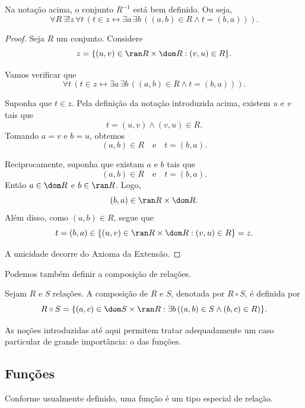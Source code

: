 \begin{lemma}[$\BST$]\label{lem:existenciaDaRelacaoInversa}
    Na notação acima, o conjunto $R^{-1}$ está bem definido.
    Ou seja,
    \[
        \forall R\, \exists! z\, \forall t\, (t \in z \leftrightarrow \exists a\, \exists b\, ((a, b) \in R \land t = (b, a))).
    \]
\end{lemma}
\begin{proof}
    Seja $R$ um conjunto.
    Considere
    \[
        z=\{(u,v)\in \ran R\times \dom R : (v,u)\in R\}.
    \]

    Vamos verificar que
    \[
        \forall t\, (t \in z \leftrightarrow \exists a\, \exists b\, ((a, b) \in R \land t = (b, a))).
    \]

    Suponha que $t \in z$.
    Pela definição da notação introduzida acima, existem $u$ e $v$ tais que
    \[
        t = (u, v) \land (v, u) \in R.
    \]
    Tomando $a=v$ e $b=u$, obtemos
    \[
        (a, b) \in R \quad \text{e} \quad t = (b, a).
    \]

    Reciprocamente, suponha que existam $a$ e $b$ tais que
    \[
        (a, b) \in R \quad \text{e} \quad t = (b, a).
    \]
    Então $a \in \dom R$ e $b \in \ran R$.
    Logo,
    \[
        (b, a) \in \ran R \times \dom R.
    \]
    Além disso, como $(a,b)\in R$, segue que
    \[
        t = (b, a) \in \{(u, v)\in \ran R \times \dom R : (v, u)\in R\} = z.
    \]

    A unicidade decorre do Axioma da Extensão.
\end{proof}

Podemos também definir a composição de relações.

\begin{definition}[$\BST$]\label{def:composicaoDeRelacoes}
    Sejam $R$ e $S$ relações.
    A composição de $R$ e $S$, denotada por $R\circ S$, é definida por
    \[
        R\circ S = \{(a, c)\in \dom S \times \ran R : \exists b\,((a, b) \in S \land (b, c) \in R)\}.
    \]
\end{definition}

As noções introduzidas até aqui permitem tratar adequadamente um caso particular de grande importância: o das funções.

\subsection{Funções}\label{subsec:funcoes}
Conforme usualmente definido, uma função é um tipo especial de relação.

